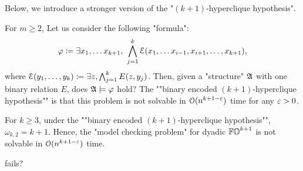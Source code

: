 Below, we introduce a stronger version of the "$(k+1)$-hyperclique hypothesis".
\begin{hypothesis}\label{hypothesis: binary encoded hyperclique hypothesis}
For $m \ge 2$,
Let us consider the following "formula":
\[\fml \defeq \exists x_1, \dots x_{k+1},\ \bigwedge_{j = 1}^{k} \mathcal{E}(x_1, \dots x_{i-1}, x_{i+1}, \dots, x_{k+1}),\]
where $\mathcal{E}(y_1, \dots, y_k) \coloneq \exists z, \bigwedge_{j = 1}^{k} E(z, y_j)$.
Then, given a "structure" $\struc$ with one binary relation $E$,
does $\struc \models \fml$ hold?
The ""binary encoded $(k+1)$-hyperclique hypothesis"" is that this problem is not solvable in $\mathcal{O}(n^{k+1 - \varepsilon})$ time for any $\varepsilon > 0$.\lipicsEnd
\end{hypothesis}
\begin{yoshiki}

\end{yoshiki}

\begin{proposition}\label{proposition: binary encoded hyperclique hypothesis}
    For $k \ge 3$, under the ""binary encoded $(k+1)$-hyperclique hypothesis"", $\omega_{k, 2} = k+1$.
    Hence, the "model checking problem" for dyadic $\mathbb{FO}^{k+1}$ is not solvable in $\mathcal{O}(n^{k + 1 - \varepsilon})$ time.
\end{proposition}

\begin{problem}
   fails?
\end{problem}

\begin{yoshiki}
\end{yoshiki}


